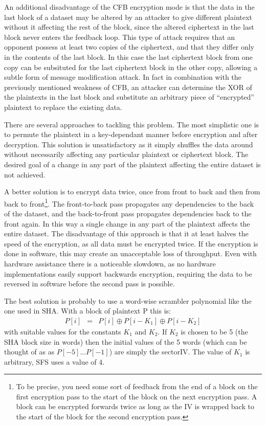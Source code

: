An additional disadvantage of the CFB encryption mode is that the data in the
last block of a dataset may be altered by an attacker to give different
plaintext without it affecting the rest of the block, since the altered
ciphertext in the last block never enters the feedback loop.  This type of
attack requires that an opponent possess at least two copies of the ciphertext,
and that they differ only in the contents of the last block.  In this case the
last ciphertext block from one copy can be subsituted for the last ciphertext
block in the other copy, allowing a subtle form of message modification attack.
In fact in combination with the previously mentioned weakness of CFB, an
attacker can determine the XOR of the plaintexts in the last block and
substitute an arbitrary piece of ``encrypted'' plaintext to replace the existing
data.

There are several approaches to tackling this problem.  The most simplistic one
is to permute the plaintext in a key-dependant manner before encryption and
after decryption.  This solution is unsatisfactory as it simply shuffles the
data around without necessarily affecting any particular plaintext or
ciphertext block.  The desired goal of a change in any part of the plaintext
affecting the entire dataset is not achieved.

A better solution is to encrypt data twice, once from front to back and then
from back to front\footnote{
               To be precise, you need some sort of feedback from the end of
               a block on the first encryption pass to the start of the block
               on the next encryption pass.  A block can be encrypted forwards
               twice as long as the IV is wrapped back to the start of the 
               block for the second encryption pass.

}.  The front-to-back pass propagates any dependencies to
the back of the dataset, and the back-to-front pass propagates dependencies
back to the front again.  In this way a single change in any part of the
plaintext affects the entire dataset.  The disadvantage of this approach is
that it at least halves the speed of the encryption, as all data must be
encrypted twice. If the encryption is done in software, this may create an
unacceptable loss of throughput.  Even with hardware assistance there is a
noticeable slowdown, as no hardware implementations easily support backwards
encryption, requiring the data to be reversed in software before the second
pass is possible.

The best solution is probably to use a word-wise scrambler polynomial like the
one used in SHA.  With a block of plaintext P this is:
\begin{eqnarray*}
    P[ i ] & = & P[ i ] \oplus P[ i-K_1 ] \oplus P[ i-K_2 ]
\end{eqnarray*}
with suitable values for the constants $K_1$ and $K_2$.  If $K_2$ is chosen to be 5 (the
SHA block size in words) then the initial values of the 5 words (which can be
thought of as as $P[ -5 ]...P[ -1 ]$) are simply the sectorIV.  The value of $K_1$
is arbitrary, SFS uses a value of 4.

